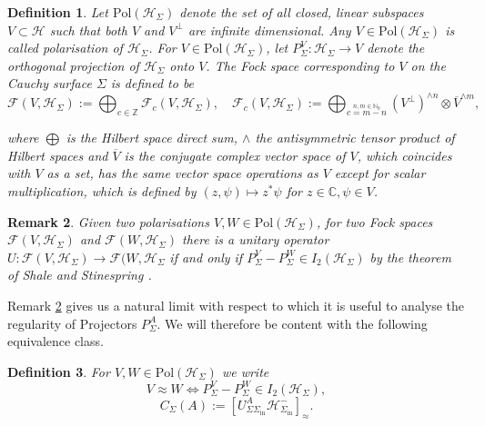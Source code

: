 \documentclass[b5paper,draft,openbib,12pt]{memoir}
\newtheorem{Def}{Definition}
\newtheorem{Remark}[Def]{Remark}
\begin{document}
\begin{Def}
Let \(\text{Pol} (\mathcal{H}_\Sigma)\) denote the set of all closed, linear subspaces \(V\subset \mathcal{H}\)
such that both \(V\) and \(V^\perp\) are infinite dimensional. Any \(V\in \text{Pol}(\mathcal{H}_\Sigma)\) is called 
\emph{polarisation} of \(\mathcal{H}_\Sigma\). For \(V\in \text{Pol}(\mathcal{H}_\Sigma)\), let \(P_\Sigma^V:\mathcal{H}_{\Sigma}\rightarrow V\) 
denote the orthogonal projection of \(\mathcal{H}_\Sigma\) onto \(V\).
The Fock space corresponding to \(V\) on the Cauchy surface \(\Sigma\) is defined to be
\begin{equation}
\mathcal{F}(V,\mathcal{H}_\Sigma) := \bigoplus_{c\in\mathbb{Z}} \mathcal{F}_c (V,\mathcal{H}_\Sigma), \quad 
\mathcal{F}_c(V,\mathcal{H}_\Sigma):= \bigoplus_{\overset{n,m\in\mathbb{N}_0}{c=m-n}}(V^\perp)^{\wedge n} \otimes \overline{V}^{\wedge m},
\end{equation}

where \(\bigoplus\) is the Hilbert space direct sum, \(\wedge\) the antisymmetric tensor product of Hilbert spaces and 
\(\overline{V}\) is the conjugate complex vector space of \(V\), which coincides with \(V\) as a set, has the same vector 
space operations as \(V\) except for scalar multiplication, which is defined by \((z,\psi)\mapsto z^* \psi\) for 
\(z\in\mathbb{C},\psi\in V\).
\end{Def}

\begin{Remark}\label{WhyUseApprox}
Given two polarisations \(V,W\in \text{Pol}(\mathcal{H}_\Sigma)\), for two Fock spaces \(\mathcal{F}(V,\mathcal{H}_\Sigma)\) and 
\(\mathcal{F}(W,\mathcal{H}_\Sigma)\) there is a unitary operator \(U: \mathcal{F}(V,\mathcal{H}_\Sigma) \rightarrow \mathcal{F}(W,\mathcal{H}_\Sigma\)
if and only if \(P^V_\Sigma - P^W_\Sigma \in I_2(\mathcal{H}_\Sigma)\) by the theorem of Shale and Stinespring 
\cite{shale1965spinor}.
\end{Remark}
Remark \ref{WhyUseApprox} gives us a natural limit with 
respect to which it is useful
to analyse the regularity of Projectors \(P_\Sigma^A\). We will therefore be content with the following equivalence class.
\begin{Def}
For \(V,W\in \text{Pol}(\mathcal{H}_\Sigma)\) we write
\begin{equation}
V\approx W \iff P^V_\Sigma - P^W_\Sigma \in I_2(\mathcal{H}_\Sigma),
\end{equation}
\begin{equation}
C_\Sigma (A):= [ U_{\Sigma \Sigma_{\text{in}}}^A \mathcal{H}_{\Sigma_{\text{in}}}^-]_\approx.
\end{equation}
\end{Def}
\end{document}
